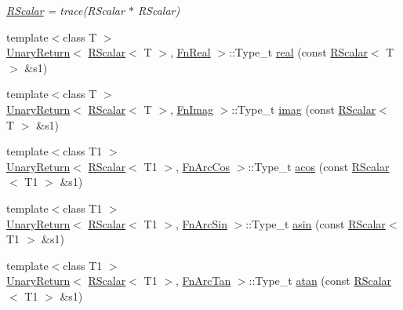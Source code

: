 \begin{DoxyCompactItemize}
\begin{DoxyCompactList}\small\item\em \mbox{\hyperlink{classENSEM_1_1RScalar}{R\+Scalar}} = trace(\+R\+Scalar $\ast$ R\+Scalar) \end{DoxyCompactList}\item 
{\footnotesize template$<$class T $>$ }\\\mbox{\hyperlink{structENSEM_1_1UnaryReturn}{Unary\+Return}}$<$ \mbox{\hyperlink{classENSEM_1_1RScalar}{R\+Scalar}}$<$ T $>$, \mbox{\hyperlink{structENSEM_1_1FnReal}{Fn\+Real}} $>$\+::Type\+\_\+t \mbox{\hyperlink{group__rscalar_ga50a51e948d621f811040859a236b48f9}{real}} (const \mbox{\hyperlink{classENSEM_1_1RScalar}{R\+Scalar}}$<$ T $>$ \&s1)
\item 
{\footnotesize template$<$class T $>$ }\\\mbox{\hyperlink{structENSEM_1_1UnaryReturn}{Unary\+Return}}$<$ \mbox{\hyperlink{classENSEM_1_1RScalar}{R\+Scalar}}$<$ T $>$, \mbox{\hyperlink{structENSEM_1_1FnImag}{Fn\+Imag}} $>$\+::Type\+\_\+t \mbox{\hyperlink{group__rscalar_ga4ab56867e71bfd12d8b60d8f60010c73}{imag}} (const \mbox{\hyperlink{classENSEM_1_1RScalar}{R\+Scalar}}$<$ T $>$ \&s1)
\item 
{\footnotesize template$<$class T1 $>$ }\\\mbox{\hyperlink{structENSEM_1_1UnaryReturn}{Unary\+Return}}$<$ \mbox{\hyperlink{classENSEM_1_1RScalar}{R\+Scalar}}$<$ T1 $>$, \mbox{\hyperlink{structENSEM_1_1FnArcCos}{Fn\+Arc\+Cos}} $>$\+::Type\+\_\+t \mbox{\hyperlink{group__rscalar_gad83b7c66ca2adeacdccb66ae00e407c9}{acos}} (const \mbox{\hyperlink{classENSEM_1_1RScalar}{R\+Scalar}}$<$ T1 $>$ \&s1)
\item 
{\footnotesize template$<$class T1 $>$ }\\\mbox{\hyperlink{structENSEM_1_1UnaryReturn}{Unary\+Return}}$<$ \mbox{\hyperlink{classENSEM_1_1RScalar}{R\+Scalar}}$<$ T1 $>$, \mbox{\hyperlink{structENSEM_1_1FnArcSin}{Fn\+Arc\+Sin}} $>$\+::Type\+\_\+t \mbox{\hyperlink{group__rscalar_ga74e5212c5ef434f0f0f94bf61b79f0fb}{asin}} (const \mbox{\hyperlink{classENSEM_1_1RScalar}{R\+Scalar}}$<$ T1 $>$ \&s1)
\item 
{\footnotesize template$<$class T1 $>$ }\\\mbox{\hyperlink{structENSEM_1_1UnaryReturn}{Unary\+Return}}$<$ \mbox{\hyperlink{classENSEM_1_1RScalar}{R\+Scalar}}$<$ T1 $>$, \mbox{\hyperlink{structENSEM_1_1FnArcTan}{Fn\+Arc\+Tan}} $>$\+::Type\+\_\+t \mbox{\hyperlink{group__rscalar_ga540f6e66ddf6d73bc001906c1578e737}{atan}} (const \mbox{\hyperlink{classENSEM_1_1RScalar}{R\+Scalar}}$<$ T1 $>$ \&s1)

\end{DoxyCompactItemize}
